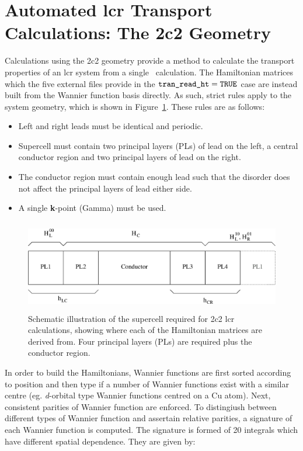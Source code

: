 \section{Automated lcr Transport Calculations: The 2c2 Geometry}
\label{sec:2c2}

Calculations using the 2c2 geometry provide a method to calculate the
transport properties of an lcr system from a single \wannier\ calculation.
The Hamiltonian matrices which the five external files provide in the 
$\verb#tran_read_ht#=\verb#TRUE#$ case are instead built from the 
Wannier function basis directly. As such, strict rules apply to the system geometry, 
which is shown in Figure~\ref{fig:2c2}. These rules are as follows:
\begin{itemize}
\item Left and right leads must be identical and periodic.
\item Supercell must contain two principal layers (PLs) of lead on the left,
a central conductor region and two principal layers of lead on the right.
\item The conductor region must contain enough lead such that the
disorder does not affect the principal layers of lead either side.
\item A single \textbf{k}-point (Gamma) must be used.
\end{itemize}

\begin{figure}[h]
\centering
\includegraphics[height=4cm]{lcr_2c2}
\caption{Schematic illustration of the supercell required for 2c2
lcr calculations, showing where each of the Hamiltonian matrices
are derived from. Four principal layers (PLs) are required plus the
conductor region.}
\label{fig:2c2}
\end{figure}

In order to build the Hamiltonians, Wannier  functions are first 
sorted according to position and then type if a number of Wannier
functions exist with a similar centre (eg. \emph{d}-orbital type Wannier
functions centred on a Cu atom). Next, consistent parities of Wannier
function are enforced. To distingiush between different types of Wannier function
and assertain relative parities, a signature of each Wannier function 
is computed. The signature is formed of 20 integrals which have
different spatial dependence. They are given by:

